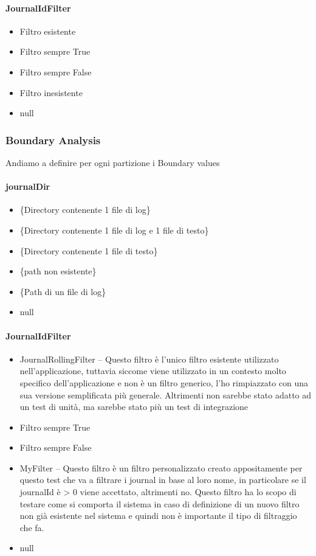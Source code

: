 \documentclass[12pt, a4paper]{article}
\begin{document}
\paragraph{JournalIdFilter}
\begin{itemize}
    \item Filtro esistente
    \item Filtro sempre True
    \item Filtro sempre False
    \item Filtro inesistente
    \item null
\end{itemize}

\subsubsection{Boundary Analysis}
Andiamo a definire per ogni partizione i Boundary values

\paragraph{journalDir}
\begin{itemize}
  \item \{Directory contenente 1 file di log\}
  \item \{Directory contenente 1 file di log e 1 file di testo\}
  \item \{Directory contenente 1 file di testo\}
  \item \{path non esistente\}
  \item \{Path di un file di log\}
  \item null
\end{itemize}

\paragraph{JournalIdFilter}
\begin{itemize}
    \item JournalRollingFilter  -- Questo filtro è l'unico filtro esistente utilizzato nell'applicazione, 
    tuttavia siccome viene utilizzato in un contesto molto specifico dell'applicazione e non è un filtro generico, l'ho rimpiazzato
    con una sua versione semplificata più generale. Altrimenti non sarebbe stato adatto ad un test di unità, ma sarebbe stato 
    più un test di integrazione
    \item Filtro sempre True
    \item Filtro sempre False
    \item MyFilter -- Questo filtro è un filtro personalizzato creato appositamente per questo test che va a filtrare i journal
    in base al loro nome, in particolare se il journalId è > 0 viene accettato, altrimenti no. 
    Questo filtro ha lo scopo di testare come si comporta il sistema in caso di definizione di un nuovo filtro non già esistente 
    nel sistema e quindi non è importante il tipo di filtraggio che fa.
    \item null
\end{itemize}
\end{document}
